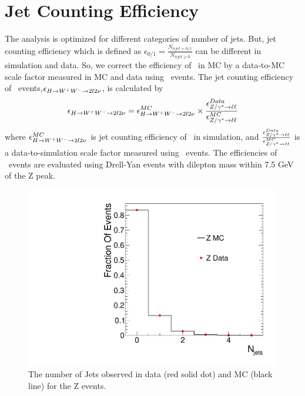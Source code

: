 \newpage
\section{Jet Counting Efficiency} 

The analysis is optimized for different categories of number of jets. 
But, jet counting efficiency which is defined as 
$\displaystyle  \epsilon_{0/1} = \frac{N_{njet=0/1}}{N_{njet\geq0}}$ 
can be different in simulation and data.  
So, we correct the efficiency of \hww~in MC by a data-to-MC scale 
factor measured in MC and data using \dyll~events.  
The jet counting efficiency of \hww~events,$\epsilon_{H\to W^+W^-\to2l2\nu}$, 
is calculated by 
\begin{eqnarray} 
\epsilon_{H\to W^+W^-\to2l2\nu} 
= \epsilon_{H\to W^+W^-\to2l2\nu}^{MC} \times \frac{\epsilon_{Z/\gamma^*\to\ell\ell}^{Data}}{\epsilon_{Z/\gamma^*\to\ell\ell}^{MC}}  
\end{eqnarray} 
where $\epsilon_{H\to W^+W^-\to2l2\nu}^{MC}$ is jet counting efficiency of \hww~in simulation, 
and $\frac{\epsilon_{Z/\gamma^*\to\ell\ell}^{Data}}{\epsilon_{Z/\gamma^*\to\ell\ell}^{MC}}$
is a data-to-simulation scale factor measured using \dyll~events.
The efficiencies of \dyll~events are evaluated using Drell-Yan events with  
dilepton mass within 7.5 GeV of the Z peak. 
\begin{figure}[!hbtp]
\centering
\includegraphics[width=.7\textwidth]{figures/Znjets.pdf}
\caption{The number of Jets observed in data (red solid dot) and MC (black line) for the Z events. }
\label{fig:znjets}
\end{figure}
